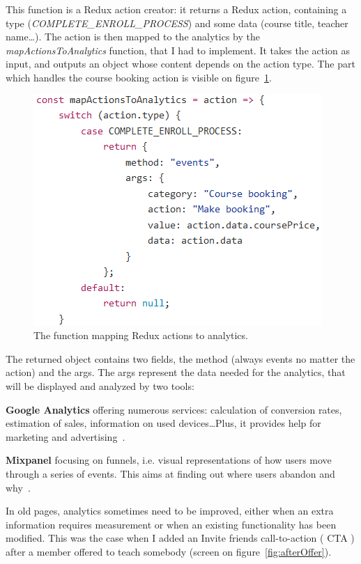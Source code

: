 This function is a Redux action creator: it returns a Redux action, containing a type (\textit{COMPLETE\_ENROLL\_PROCESS}) and some data (course title, teacher name\ldots). The action is then mapped to the analytics by the \textit{mapActionsToAnalytics} function, that I had to implement. It takes the action as input, and outputs an object whose content depends on the action type. The part which handles the course booking action is visible on {\sc figure}~\ref{fig:mapActions}.

\begin{figure}[H]
    \centering
    \includegraphics{figure/mapActions.png}
    \caption{The function mapping Redux actions to analytics.}
    \label{fig:mapActions}
\end{figure}

The returned object contains two fields, the method (always \guillemotleft{} events \guillemotright{} no matter the action) and the args. The args represent the data needed for the analytics, that will be displayed and analyzed by two tools:

\textbf{Google Analytics} offering numerous services: calculation of conversion rates, estimation of sales, information on used devices\ldots Plus, it provides help for marketing and advertising~\cite{googleAnalytics}.

\textbf{Mixpanel} focusing on funnels, i.e. visual representations of how users move through a series of events. This aims at finding out where users abandon and why~\cite{mixpanel}.

In old pages, analytics sometimes need to be improved, either when an extra information requires measurement or when an existing functionality has been modified. This was the case when I added an \guillemotleft{} Invite friends \guillemotright{} call-to-action (\guillemotleft{} CTA \guillemotright{}) after a member offered to teach somebody (screen on {\sc figure}~\ref{fig:afterOffer}).

